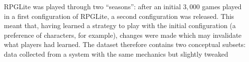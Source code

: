 \label{seasons_of_rpglite}
RPGLite was played through two ``seasons'': after an initial $3,000$ games
played in a first configuration of RPGLite, a second configuration was released.
This meant that, having learned a strategy to play with the initial
configuration (a preference of characters, for example), changes were made which
may invalidate what players had learned. The dataset therefore contains two
conceptual subsets: data collected from a system with the same mechanics but
slightly tweaked
